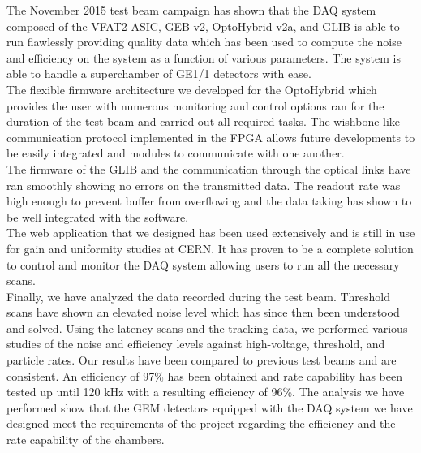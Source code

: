     The November 2015 test beam campaign has shown that the DAQ system composed of the VFAT2 ASIC, GEB v2, OptoHybrid v2a, and GLIB is able to run flawlessly providing quality data which has been used to compute the noise and efficiency on the system as a function of various parameters. The system is able to handle a superchamber of GE1/1 detectors with ease. \\

    The flexible firmware architecture we developed for the OptoHybrid which provides the user with numerous monitoring and control options ran for the duration of the test beam and carried out all required tasks. The wishbone-like communication protocol implemented in the FPGA allows future developments to be easily integrated and modules to communicate with one another. \\

    The firmware of the GLIB and the communication through the optical links have ran smoothly showing no errors on the transmitted data. The readout rate was high enough to prevent buffer from overflowing and the data taking has shown to be well integrated with the software. \\

    The web application that we designed has been used extensively and is still in use for gain and uniformity studies at CERN. It has proven to be a complete solution to control and monitor the DAQ system allowing users to run all the necessary scans. \\

    Finally, we have analyzed the data recorded during the test beam. Threshold scans have shown an elevated noise level which has since then been understood and solved. Using the latency scans and the tracking data, we performed various studies of the noise and efficiency levels against high-voltage, threshold, and particle rates. Our results have been compared to previous test beams and are consistent. An efficiency of 97\% has been obtained and rate capability has been tested up until 120 kHz with a resulting efficiency of 96\%. The analysis we have performed show that the GEM detectors equipped with the DAQ system we have designed meet the requirements of the project regarding the efficiency and the rate capability of the chambers.
